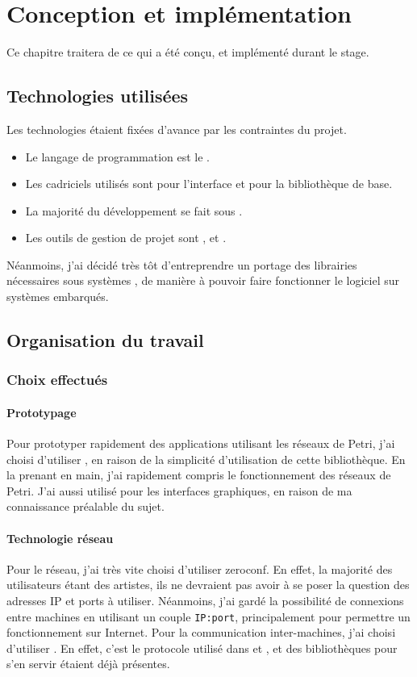 \chapter{Conception et implémentation}
\label{chapterImpl}

Ce chapitre traitera de ce qui a été conçu, et implémenté durant le stage.
\section{Technologies utilisées}
Les technologies étaient fixées d'avance par les contraintes du projet.

\begin{itemize}
	\item Le langage de programmation est le .
	\item Les cadriciels utilisés sont  pour l'interface et  pour la bibliothèque de base.
	\item La majorité du développement se fait sous .
	\item Les outils de gestion de projet sont ,  et .
\end{itemize}

Néanmoins, j'ai décidé très tôt d'entreprendre un portage des librairies nécessaires sous systèmes , de manière à pouvoir faire fonctionner le logiciel sur systèmes embarqués.

\section{Organisation du travail}
\subsection{Choix effectués}
\subsubsection{Prototypage}
Pour prototyper rapidement des applications utilisant les réseaux de Petri, j'ai choisi d'utiliser , en raison de la simplicité d'utilisation de cette bibliothèque. En la prenant en main, j'ai rapidement compris le fonctionnement des réseaux de Petri.
J'ai aussi utilisé  pour les interfaces graphiques, en raison de ma connaissance préalable du sujet.

\subsubsection{Technologie réseau}
Pour le réseau, j'ai très vite choisi d'utiliser \gls{zeroconf}. En effet, la majorité des utilisateurs étant des artistes, ils ne devraient pas avoir à se poser la question des adresses IP et ports à utiliser.
Néanmoins, j'ai gardé la possibilité de connexions entre machines en utilisant un couple \verb|IP:port|, principalement pour permettre un fonctionnement sur Internet.
Pour la communication inter-machines, j'ai choisi d'utiliser . En effet, c'est le protocole utilisé dans  et , et des bibliothèques pour s'en servir étaient déjà présentes.

